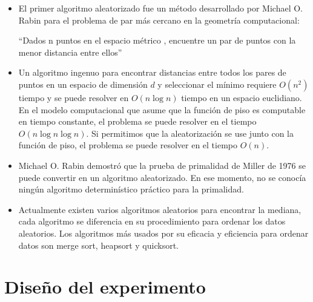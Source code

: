 \documentclass[final,a4paper,romanappendices]{IEEEtran}\usepackage[]{graphicx}\usepackage[]{color}
\theoremstyle{definition}
\begin{document}
\begin{itemize}
  \item El primer algoritmo aleatorizado fue un método desarrollado por Michael O. Rabin para el problema de par más cercano en la geometría computacional:

{\centering
``Dados n puntos en el espacio métrico , encuentre un par de puntos con la menor distancia entre ellos''\par
}
  \item Un algoritmo ingenuo para encontrar distancias entre todos los pares de puntos en un espacio de dimensión $d$ y seleccionar el mínimo requiere $O(n^2)$ tiempo y se puede resolver en $O(n\log n)$ tiempo en un espacio euclidiano. En el modelo computacional que
asume que la función de piso es computable en tiempo constante, el problema se puede resolver en el tiempo $O(n\log n\log n)$. Si permitimos que la aleatorización se use junto con la función de piso, el problema se puede resolver en el tiempo $O(n)$.
  \item Michael O. Rabin demostró que la prueba de primalidad de Miller de 1976 se puede convertir en un algoritmo aleatorizado. En ese momento, no se conocía ningún algoritmo determinístico práctico para la primalidad.
  \item Actualmente existen varios algoritmos aleatorios para encontrar la mediana, cada algoritmo se diferencia en su procedimiento para ordenar los datos aleatorios. Los algoritmos más usados por su eficacia y eficiencia para ordenar datos son merge sort, heapsort y quicksort.
\end{itemize}

\section{Diseño del experimento}
\end{document}
